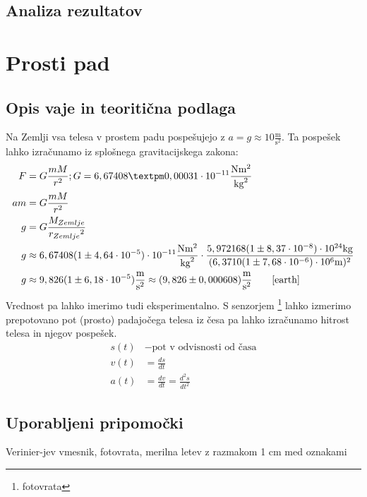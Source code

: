 \documentclass[12pt]{article}
\begin{document}
	\subsection*{Analiza rezultatov}

\newpage
\section{Prosti pad}
 	\subsection*{Opis vaje in teoritična podlaga}
	Na Zemlji vsa telesa v prostem padu pospešujejo z $ a = g \approx 10 \frac{\text{m}}{{\text{s}}^2}$.
	Ta pospešek lahko izračunamo iz splošnega gravitacijskega zakona:
	\begin{equation}
		\label{gravity}
		\begin{split}
			F &= G \frac{mM}{r^2}; G = 6,67408 ± 0,00031 \cdot 10^{-11} \frac{\text{N}\text{m}^2}{\text{kg}^2} \\
			a m &= G \frac{mM}{r^2} \\
			g &= G \frac{M_{Zemlje}}{{r_{Zemlje}}^2} \\
			g &\approx 6,67408 (1 \pm 4,64 \cdot 10^{-5}) \cdot 10^{-11} \frac{\text{N}\text{m}^2}{\text{kg}^2} \cdot \frac{5,972168 (1 \pm 8,37 \cdot 10 ^{-8}) \cdot 10^{24} \text{kg} }{(6,3710 (1 \pm 7,68 \cdot 10^{-6}) \cdot 10^6 \text{m}) ^2} \\
			g &\approx 9,826 (1 \pm 6,18 \cdot 10^{-5}) \frac{\text{m}}{\text{s}^2} \approx (9,826 \pm 0,000608) \frac{\text{m}}{\text{s}^2} \qquad \mbox{\cite{earth}}
		\end{split}
	\end{equation}
	Vrednost pa lahko imerimo tudi eksperimentalno. S senzorjem \footnote{fotovrata} lahko
	izmerimo prepotovano pot (prosto) padajočega telesa iz česa pa lahko izračunamo hitrost
	telesa in njegov pospešek.
	\begin{equation}
		\begin{split}
			s(t) &- \text{pot v odvisnosti od časa} \\
			v(t) &= \frac{ds}{dt} \\
			a(t) &= \frac{dv}{dt} = \frac{d^2s}{{dt}^2}
		\end{split}	
	\end{equation}


 	\subsection*{Uporabljeni pripomočki}
	Verinier-jev vmesnik, fotovrata, merilna letev z razmakom 1 cm med oznakami
	\vspace{\fill}
\end{document}
